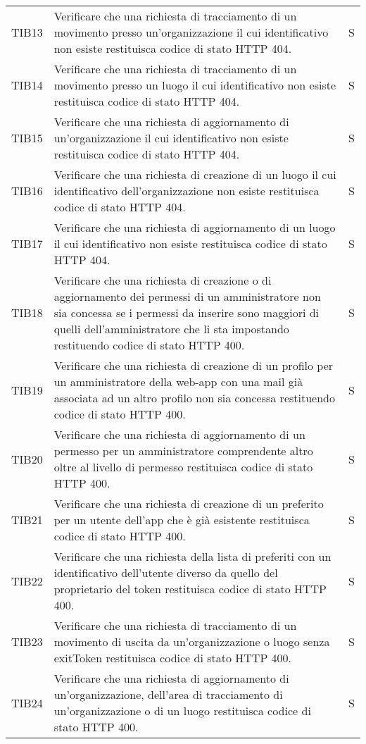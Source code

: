 {\begin{longtable}{ c C{13cm} C{1cm}}
TIB13 & Verificare che una richiesta di tracciamento di un movimento presso un'organizzazione il cui identificativo non esiste restituisca codice di stato HTTP 404. & S \\
TIB14 & Verificare che una richiesta di tracciamento di un movimento presso un luogo il cui identificativo non esiste restituisca codice di stato HTTP 404. & S \\
TIB15 & Verificare che una richiesta di aggiornamento di un'organizzazione il cui identificativo non esiste restituisca codice di stato HTTP 404. & S \\
TIB16 & Verificare che una richiesta di creazione di un luogo il cui identificativo dell'organizzazione non esiste restituisca codice di stato HTTP 404. & S \\
TIB17 & Verificare che una richiesta di aggiornamento di un luogo il cui identificativo non esiste restituisca codice di stato HTTP 404. & S \\
TIB18 & Verificare che una richiesta di creazione o di aggiornamento dei permessi di un amministratore non sia concessa se i permessi da inserire sono maggiori di quelli dell'amministratore che li sta impostando restituendo codice di stato HTTP 400. & S \\
TIB19 & Verificare che una richiesta di creazione di un profilo per un amministratore della web-app con una mail già associata ad un altro profilo non sia concessa restituendo codice di stato HTTP 400. & S \\
TIB20 & Verificare che una richiesta di aggiornamento di un permesso per un amministratore comprendente altro oltre al livello di permesso restituisca codice di stato HTTP 400. & S \\
TIB21 & Verificare che una richiesta di creazione di un preferito per un utente dell'app che è già esistente restituisca codice di stato HTTP 400. & S \\
TIB22 & Verificare che una richiesta della lista di preferiti con un identificativo dell'utente diverso da quello del proprietario del token restituisca codice di stato HTTP 400. & S \\
TIB23 & Verificare che una richiesta di tracciamento di un movimento di uscita da un'organizzazione o luogo senza exitToken restituisca codice di stato HTTP 400. & S \\
TIB24 & Verificare che una richiesta di aggiornamento di un'organizzazione, dell'area di tracciamento di un'organizzazione o di un luogo restituisca codice di stato HTTP 400. & S \\

\end{longtable}}
